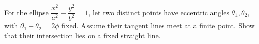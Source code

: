 For the ellipse $\dfrac{x^2}{a^2}+\dfrac{y^2}{b^2}=1$, let two distinct points have eccentric angles $\theta_1,\theta_2$, with $\theta_1+\theta_2=2\phi$ fixed. Assume their tangent lines meet at a finite point. Show that their intersection lies on a fixed straight line.
